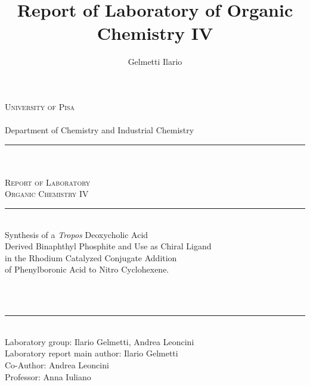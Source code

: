 \documentclass[a4paper, english, twoside, 12pt, openany]{book}
\title{Report of Laboratory of Organic Chemistry IV
}
\author{Gelmetti Ilario}%
\date{}%
\begin{document}
\frontmatter


\addtolength{\hoffset}{23pt}
\begin{titlepage}

\begin{center}
   	{\LARGE\textsc{University of Pisa}}\\\\\vspace{5pt}
   	{Department of Chemistry and Industrial Chemistry}\\
		\rule{5cm}{1pt}\\	
			\makebox[\textwidth]{\rule{0pt}{.22\textheight}}\\
	\LARGE{\textsc{Report of Laboratory\\Organic Chemistry IV}}\\\rule{2cm}{1pt}\\
\Large{%
Synthesis of a \emph{Tropos} Deoxycholic Acid\\ Derived Binaphthyl Phosphite and Use as Chiral Ligand\\ in the Rhodium Catalyzed Conjugate Addition\\ of Phenylboronic Acid to Nitro Cyclohexene.}\\
	\bigskip	
		\makebox[.2\textwidth]{\rule{0pt}{.1\textheight}}\\
\end{center}


\vfill
\begin{small}
\makebox[\textwidth]{\rule{0pt}{.02\textheight}}\\
	\begin{center}
	\rule{3cm}{1pt}\\\vspace{10pt}
	Laboratory group: {\LARGE Ilario Gelmetti, Andrea Leoncini}\\\vspace{5pt}
	Laboratory report main author: {\LARGE Ilario Gelmetti}\\\vspace{5pt}
	Co-Author: {\LARGE Andrea Leoncini}\\\vspace{5pt} 
	Professor: {\LARGE Anna Iuliano}\\
	\end{center}
\end{small}

\end{titlepage}
\end{document}
